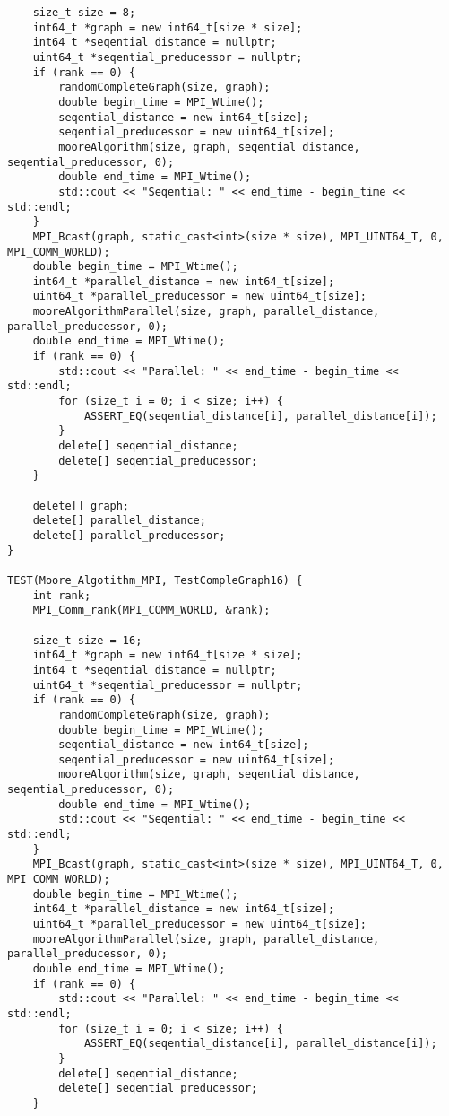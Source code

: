 \documentclass{report}
\begin{document}
\begin{lstlisting}
    size_t size = 8;
    int64_t *graph = new int64_t[size * size];
    int64_t *seqential_distance = nullptr;
    uint64_t *seqential_preducessor = nullptr;
    if (rank == 0) {
        randomCompleteGraph(size, graph);
        double begin_time = MPI_Wtime();
        seqential_distance = new int64_t[size];
        seqential_preducessor = new uint64_t[size];
        mooreAlgorithm(size, graph, seqential_distance, seqential_preducessor, 0);
        double end_time = MPI_Wtime();
        std::cout << "Seqential: " << end_time - begin_time << std::endl;
    }
    MPI_Bcast(graph, static_cast<int>(size * size), MPI_UINT64_T, 0, MPI_COMM_WORLD);
    double begin_time = MPI_Wtime();
    int64_t *parallel_distance = new int64_t[size];
    uint64_t *parallel_preducessor = new uint64_t[size];
    mooreAlgorithmParallel(size, graph, parallel_distance, parallel_preducessor, 0);
    double end_time = MPI_Wtime();
    if (rank == 0) {
        std::cout << "Parallel: " << end_time - begin_time << std::endl;
        for (size_t i = 0; i < size; i++) {
            ASSERT_EQ(seqential_distance[i], parallel_distance[i]);
        }
        delete[] seqential_distance;
        delete[] seqential_preducessor;
    }

    delete[] graph;
    delete[] parallel_distance;
    delete[] parallel_preducessor;
}

TEST(Moore_Algotithm_MPI, TestCompleGraph16) {
    int rank;
    MPI_Comm_rank(MPI_COMM_WORLD, &rank);

    size_t size = 16;
    int64_t *graph = new int64_t[size * size];
    int64_t *seqential_distance = nullptr;
    uint64_t *seqential_preducessor = nullptr;
    if (rank == 0) {
        randomCompleteGraph(size, graph);
        double begin_time = MPI_Wtime();
        seqential_distance = new int64_t[size];
        seqential_preducessor = new uint64_t[size];
        mooreAlgorithm(size, graph, seqential_distance, seqential_preducessor, 0);
        double end_time = MPI_Wtime();
        std::cout << "Seqential: " << end_time - begin_time << std::endl;
    }
    MPI_Bcast(graph, static_cast<int>(size * size), MPI_UINT64_T, 0, MPI_COMM_WORLD);
    double begin_time = MPI_Wtime();
    int64_t *parallel_distance = new int64_t[size];
    uint64_t *parallel_preducessor = new uint64_t[size];
    mooreAlgorithmParallel(size, graph, parallel_distance, parallel_preducessor, 0);
    double end_time = MPI_Wtime();
    if (rank == 0) {
        std::cout << "Parallel: " << end_time - begin_time << std::endl;
        for (size_t i = 0; i < size; i++) {
            ASSERT_EQ(seqential_distance[i], parallel_distance[i]);
        }
        delete[] seqential_distance;
        delete[] seqential_preducessor;
    }


\end{lstlisting}
\end{document}
